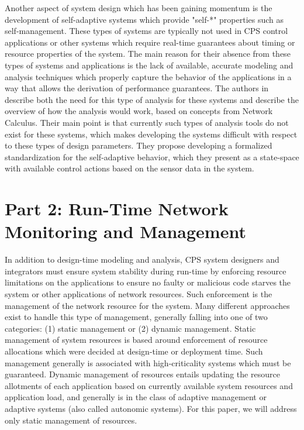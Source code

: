 Another aspect of system design which has been gaining momentum is the development of self-adaptive systems which provide "self-*" properties such as self-management.  These types of systems are typically not used in CPS control applications or other systems which require real-time guarantees about timing or resource properties of the system.  The main reason for their absence from these types of systems and applications is the lack of available, accurate modeling and analysis techniques which properly capture the behavior of the applications in a way that allows the derivation of performance guarantees.  The authors in \cite{NCadaptivesystems} describe both the need for this type of analysis for these systems and describe the overview of how the analysis would work, based on concepts from Network Calculus.  Their main point is that currently such types of analysis tools do not exist for these systems, which makes developing the systems difficult with respect to these types of design parameters.  They propose developing a formalized standardization for the self-adaptive behavior, which they present as a state-space with available control actions based on the sensor data in the system. 

\section{Part 2: Run-Time Network Monitoring and Management}
\label{sec:related_part2}

In addition to design-time modeling and analysis, CPS system designers and integrators must ensure system stability during run-time by enforcing resource limitations on the applications to ensure no faulty or malicious code starves the system or other applications of network resources.  Such enforcement is the management of the network resource for the system.  Many different approaches exist to handle this type of management, generally falling into one of two categories: (1) static management or (2) dynamic management.  Static management of system resources is based around enforcement of resource allocations which were decided at design-time or deployment time.  Such management generally is associated with high-criticality systems which must be guaranteed.  Dynamic management of resources entails updating the resource allotments of each application based on currently available system resources and application load, and generally is in the class of adaptive management or adaptive systems (also called autonomic systems).  For this paper, we will address only static management of resources.  


